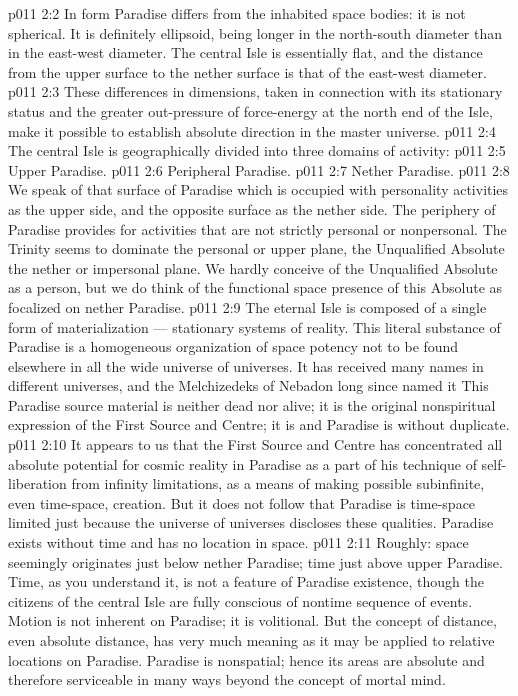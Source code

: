 \vs p011 2:2 \pc In form Paradise differs from the inhabited space bodies: it is not spherical. It is definitely ellipsoid, being  longer in the north\hyp{}south diameter than in the east\hyp{}west diameter. The central Isle is essentially flat, and the distance from the upper surface to the nether surface is  that of the east\hyp{}west diameter.
\vs p011 2:3 These differences in dimensions, taken in connection with its stationary status and the greater out\hyp{}pressure of force\hyp{}energy at the north end of the Isle, make it possible to establish absolute direction in the master universe.
\vs p011 2:4 \pc The central Isle is geographically divided into three domains of activity:
\vs p011 2:5 \bibnobreakspace Upper Paradise.
\vs p011 2:6 \bibnobreakspace Peripheral Paradise.
\vs p011 2:7 \bibnobreakspace Nether Paradise.
\vs p011 2:8 \pc We speak of that surface of Paradise which is occupied with personality activities as the upper side, and the opposite surface as the nether side. The periphery of Paradise provides for activities that are not strictly personal or nonpersonal. The Trinity seems to dominate the personal or upper plane, the Unqualified Absolute the nether or impersonal plane. We hardly conceive of the Unqualified Absolute as a person, but we do think of the functional space presence of this Absolute as focalized on nether Paradise.
\vs p011 2:9 \pc The eternal Isle is composed of a single form of materialization --- stationary systems of reality. This literal substance of Paradise is a homogeneous organization of space potency not to be found elsewhere in all the wide universe of universes. It has received many names in different universes, and the Melchizedeks of Nebadon long since named it  This Paradise source material is neither dead nor alive; it is the original nonspiritual expression of the First Source and Centre; it is  and Paradise is without duplicate.
\vs p011 2:10 It appears to us that the First Source and Centre has concentrated all absolute potential for cosmic reality in Paradise as a part of his technique of self\hyp{}liberation from infinity limitations, as a means of making possible subinfinite, even time\hyp{}space, creation. But it does not follow that Paradise is time\hyp{}space limited just because the universe of universes discloses these qualities. Paradise exists without time and has no location in space.
\vs p011 2:11 Roughly: space seemingly originates just below nether Paradise; time just above upper Paradise. Time, as you understand it, is not a feature of Paradise existence, though the citizens of the central Isle are fully conscious of nontime sequence of events. Motion is not inherent on Paradise; it is volitional. But the concept of distance, even absolute distance, has very much meaning as it may be applied to relative locations on Paradise. Paradise is nonspatial; hence its areas are absolute and therefore serviceable in many ways beyond the concept of mortal mind.
